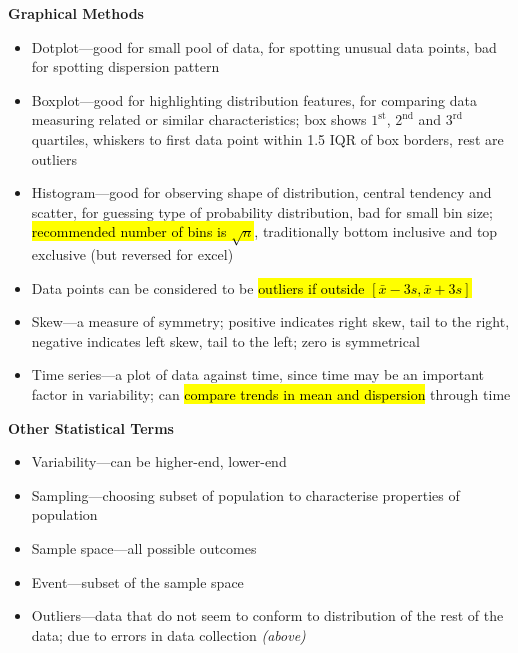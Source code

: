 \documentclass{article}
\newcommand{\headingsmall}[1]{{\small\textbf{#1}}}
\begin{document}
\begin{multicols*}{4}
\headingsmall{Graphical Methods}
\begin{itemize} \itemsep -0.5em
    \item Dotplot---good for small pool of data, for spotting unusual data points,
        bad for spotting dispersion pattern
    \item Boxplot---good for highlighting distribution features, for comparing
        data measuring related or similar characteristics; box shows $1^\mathrm{st}$,
     $2^\mathrm{nd}$ and $3^\mathrm{rd}$ quartiles, whiskers to first data point
        within 1.5 IQR of box borders, rest are outliers
    \item Histogram---good for observing shape of distribution, central tendency and scatter,
        for guessing type of probability distribution, bad for small bin size;
        \hl{recommended number of bins is $\sqrt{n}$}, traditionally bottom 
        inclusive and top exclusive (but reversed for excel)
    \item Data points can be considered to be \hl{outliers if outside 
        $[\bar x-3s, \bar x+3s]$}
    \item Skew---a measure of symmetry; positive indicates right skew, tail to the right,
        negative indicates left skew, tail to the left; zero is symmetrical
    \item Time series---a plot of data against time, since time may be an important
        factor in variability; can \hl{compare trends in mean and dispersion} through time
\end{itemize}

\headingsmall{Other Statistical Terms}
\begin{itemize} \itemsep -0.5em
    \item Variability---can be higher-end, lower-end
    \item Sampling---choosing subset of population to characterise 
        properties of population
    \item Sample space---all possible outcomes
    \item Event---subset of the sample space
    \item Outliers---data that do not seem to conform to distribution
        of the rest of the data; due to errors in data collection 
        \textit{(above)}
\end{itemize}


\end{multicols*}
\end{document}
